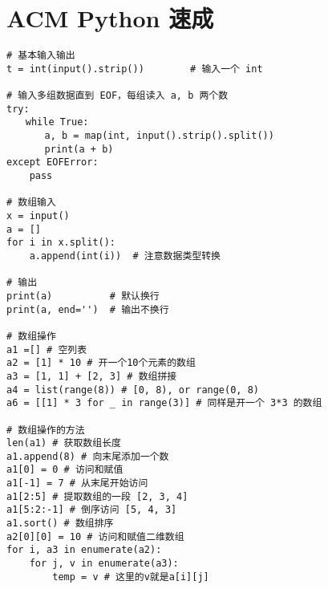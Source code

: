 \section{ACM Python 速成}

\begin{verbatim}
# 基本输入输出
t = int(input().strip())        # 输入一个 int

# 输入多组数据直到 EOF，每组读入 a, b 两个数
try:
　　while True:
　　　　a, b = map(int, input().strip().split())
　　　　print(a + b)
except EOFError:
    pass

# 数组输入
x = input()
a = []
for i in x.split():
    a.append(int(i))  # 注意数据类型转换

# 输出
print(a)          # 默认换行
print(a, end='')  # 输出不换行

# 数组操作
a1 =[] # 空列表
a2 = [1] * 10 # 开一个10个元素的数组
a3 = [1, 1] + [2, 3] # 数组拼接
a4 = list(range(8)) # [0, 8), or range(0, 8)
a6 = [[1] * 3 for _ in range(3)] # 同样是开一个 3*3 的数组

# 数组操作的方法
len(a1) # 获取数组长度
a1.append(8) # 向末尾添加一个数
a1[0] = 0 # 访问和赋值
a1[-1] = 7 # 从末尾开始访问
a1[2:5] # 提取数组的一段 [2, 3, 4]
a1[5:2:-1] # 倒序访问 [5, 4, 3]
a1.sort() # 数组排序
a2[0][0] = 10 # 访问和赋值二维数组
for i, a3 in enumerate(a2):
    for j, v in enumerate(a3):
        temp = v # 这里的v就是a[i][j]
\end{verbatim}